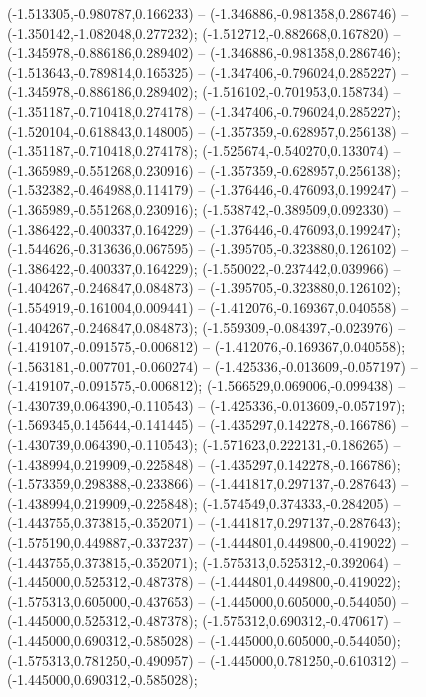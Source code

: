  (-1.513305,-0.980787,0.166233) -- (-1.346886,-0.981358,0.286746) -- (-1.350142,-1.082048,0.277232);
 (-1.512712,-0.882668,0.167820) -- (-1.345978,-0.886186,0.289402) -- (-1.346886,-0.981358,0.286746);
 (-1.513643,-0.789814,0.165325) -- (-1.347406,-0.796024,0.285227) -- (-1.345978,-0.886186,0.289402);
 (-1.516102,-0.701953,0.158734) -- (-1.351187,-0.710418,0.274178) -- (-1.347406,-0.796024,0.285227);
 (-1.520104,-0.618843,0.148005) -- (-1.357359,-0.628957,0.256138) -- (-1.351187,-0.710418,0.274178);
 (-1.525674,-0.540270,0.133074) -- (-1.365989,-0.551268,0.230916) -- (-1.357359,-0.628957,0.256138);
 (-1.532382,-0.464988,0.114179) -- (-1.376446,-0.476093,0.199247) -- (-1.365989,-0.551268,0.230916);
 (-1.538742,-0.389509,0.092330) -- (-1.386422,-0.400337,0.164229) -- (-1.376446,-0.476093,0.199247);
 (-1.544626,-0.313636,0.067595) -- (-1.395705,-0.323880,0.126102) -- (-1.386422,-0.400337,0.164229);
 (-1.550022,-0.237442,0.039966) -- (-1.404267,-0.246847,0.084873) -- (-1.395705,-0.323880,0.126102);
 (-1.554919,-0.161004,0.009441) -- (-1.412076,-0.169367,0.040558) -- (-1.404267,-0.246847,0.084873);
 (-1.559309,-0.084397,-0.023976) -- (-1.419107,-0.091575,-0.006812) -- (-1.412076,-0.169367,0.040558);
 (-1.563181,-0.007701,-0.060274) -- (-1.425336,-0.013609,-0.057197) -- (-1.419107,-0.091575,-0.006812);
 (-1.566529,0.069006,-0.099438) -- (-1.430739,0.064390,-0.110543) -- (-1.425336,-0.013609,-0.057197);
 (-1.569345,0.145644,-0.141445) -- (-1.435297,0.142278,-0.166786) -- (-1.430739,0.064390,-0.110543);
 (-1.571623,0.222131,-0.186265) -- (-1.438994,0.219909,-0.225848) -- (-1.435297,0.142278,-0.166786);
 (-1.573359,0.298388,-0.233866) -- (-1.441817,0.297137,-0.287643) -- (-1.438994,0.219909,-0.225848);
 (-1.574549,0.374333,-0.284205) -- (-1.443755,0.373815,-0.352071) -- (-1.441817,0.297137,-0.287643);
 (-1.575190,0.449887,-0.337237) -- (-1.444801,0.449800,-0.419022) -- (-1.443755,0.373815,-0.352071);
 (-1.575313,0.525312,-0.392064) -- (-1.445000,0.525312,-0.487378) -- (-1.444801,0.449800,-0.419022);
 (-1.575313,0.605000,-0.437653) -- (-1.445000,0.605000,-0.544050) -- (-1.445000,0.525312,-0.487378);
 (-1.575312,0.690312,-0.470617) -- (-1.445000,0.690312,-0.585028) -- (-1.445000,0.605000,-0.544050);
 (-1.575313,0.781250,-0.490957) -- (-1.445000,0.781250,-0.610312) -- (-1.445000,0.690312,-0.585028);
